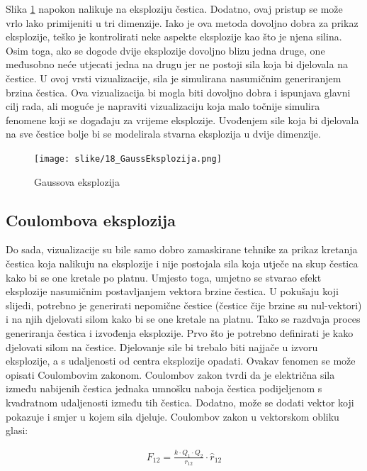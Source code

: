 \documentclass{foi}
\begin{document}
Slika \ref{fig:GaussEksplozija} napokon nalikuje na eksploziju čestica. Dodatno, ovaj pristup se može vrlo lako primijeniti u tri dimenzije. Iako je ova metoda dovoljno dobra za prikaz eksplozije, teško je kontrolirati neke aspekte eksplozije kao što je njena silina. Osim toga, ako se dogode dvije eksplozije dovoljno blizu jedna druge, one međusobno neće utjecati jedna na drugu jer ne postoji sila koja bi djelovala na čestice. U ovoj vrsti vizualizacije, sila je simulirana nasumičnim generiranjem brzina čestica. Ova vizualizacija bi mogla biti dovoljno dobra i ispunjava glavni cilj rada, ali moguće je napraviti vizualizaciju koja malo točnije simulira fenomene koji se događaju za vrijeme eksplozije. Uvođenjem sile koja bi djelovala na sve čestice bolje bi se modelirala stvarna eksplozija u dvije dimenzije.

\begin{figure}[H]
    \centering
    \texttt{[image: slike/18\_GaussEksplozija.png]}
    \captionsetup{justification=centering}
    \caption{Gaussova eksplozija}
\label{fig:GaussEksplozija}
\end{figure}


\subsection{Coulombova eksplozija}
Do sada, vizualizacije su bile samo dobro zamaskirane tehnike za prikaz kretanja čestica koja nalikuju na eksplozije i nije postojala sila koja utječe na skup čestica kako bi se one kretale po platnu. Umjesto toga, umjetno se stvarao efekt eksplozije nasumičnim postavljanjem vektora brzine čestica. U pokušaju koji slijedi, potrebno je generirati nepomične čestice (čestice čije brzine su nul-vektori) i na njih djelovati silom kako bi se one kretale na platnu. Tako se razdvaja proces generiranja čestica i izvođenja eksplozije. Prvo što je potrebno definirati je kako djelovati silom na čestice. Djelovanje sile bi trebalo biti najjače u izvoru eksplozije, a s udaljenosti od centra eksplozije opadati. Ovakav fenomen se može opisati Coulombovim zakonom. Coulombov zakon tvrdi da je električna sila između nabijenih čestica jednaka umnošku naboja čestica podijeljenom s kvadratnom udaljenosti između tih čestica. Dodatno, može se dodati vektor koji pokazuje i smjer u kojem sila djeluje. Coulombov zakon u vektorskom obliku \parencite{ByjusCoulombsLaw} glasi:

 \begin{align*}
F_{12} = \frac{k\cdot Q_1\cdot Q_2}{r_{12}}\cdot \hat{r}_{12}
\end{align*}
\end{document}
